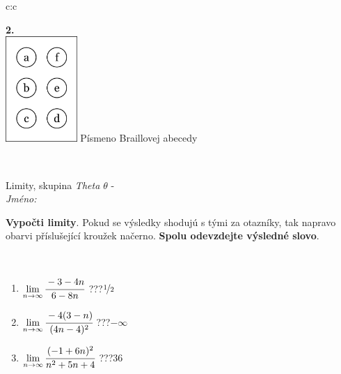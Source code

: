 \documentclass[10pt]{report}
\begin{document}
\begin{tabular}{c:c}
\begin{minipage}[c][104.5mm][t]{0.5\linewidth}
\begin{center}
\begin{minipage}{0.20\linewidth}
\begin{center}
{\Huge\bfseries 2.} \\[2mm]
\includegraphics[height=40mm]{../images/braille.png}
{\small Písmeno Braillovej abecedy}
\end{center}
\end{minipage}
\end{center}
\end{minipage}
\\ \hdashline
\begin{minipage}[c][104.5mm][t]{0.5\linewidth}
\begin{center}
\vspace{7mm}
{\huge Limity, skupina \textit{Theta $\theta$} -}\\[5mm]
\textit{Jméno:}\phantom{xxxxxxxxxxxxxxxxxxxxxxxxxxxxxxxxxxxxxxxxxxxxxxxxxxxxxxxxxxxxxxxxx}\\[5mm]
\begin{minipage}{0.95\linewidth}
\begin{center}
\textbf{Vypočti limity}. Pokud se výsledky shodujú s tými za otazníky, tak napravo\\obarvi příslušející kroužek načerno. \textbf{Spolu odevzdejte výsledné slovo}.
\end{center}
\end{minipage}
\\[1mm]
\begin{minipage}{0.79\linewidth}
\begin{center}
\begin{varwidth}{\linewidth}
\begin{enumerate}
\normalsize
\item $\lim\limits_{n\to\infty}\cfrac{-3-4n}{6-8n}$\quad \dotfill\; ???\;\dotfill \quad $\nicefrac{1}{2}$
\item $\lim\limits_{n\to\infty}\cfrac{-4(3-n)}{(4n-4)^2}$\quad \dotfill\; ???\;\dotfill \quad $-\infty$
\item $\lim\limits_{n\to\infty}\cfrac{(-1+6n)^2}{n^2+5n+4}$\quad \dotfill\; ???\;\dotfill \quad $36$

\end{enumerate}
\end{varwidth}
\end{center}
\end{minipage}
\end{center}
\end{minipage}
\end{tabular}
\end{document}
